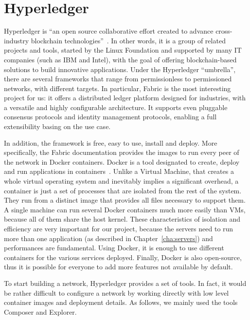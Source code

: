 \section{Hyperledger}
\label{sec:hyperledger}
Hyperledger is ``an open source collaborative effort created to advance cross-industry blockchain technologies''~\cite{hyperledger}. In other words, it is a group of related projects and tools, started by the Linux Foundation and supported by many IT companies (such as IBM and Intel), with the goal of offering blockchain-based solutions to build innovative applications. Under the Hyperledger ``umbrella'', there are several frameworks that range from permissionless to permissioned networks, with different targets. In particular, Fabric is the most interesting project for us: it offers a distributed ledger platform designed for industries, with a versatile and highly configurable architecture. It supports even pluggable consensus protocols and identity management protocols, enabling a full extensibility basing on the use case.

In addition, the framework is free, easy to use, install and deploy. More specifically, the Fabric documentation provides the images to run every peer of the network in Docker containers. Docker is a tool designated to create, deploy and run applications in containers~\cite{docker}. Unlike a Virtual Machine, that creates a whole virtual operating system and inevitably implies a significant overhead, a container is just a set of processes that are isolated from the rest of the system. They run from a distinct image that provides all files necessary to support them. A single machine can run several Docker containers much more easily than VMs, because all of them share the host kernel. These characteristics of isolation and efficiency are very important for our project, because the servers need to run more than one application (as described in Chapter~\ref{cha:servers}) and performances are fundamental. Using Docker, it is enough to use different containers for the various services deployed. Finally, Docker is also open-source, thus it is possible for everyone to add more features not available by default.

To start building a network, Hyperledger provides a set of tools. In fact, it would be rather difficult to configure a network by working directly with low level container images and deployment details. As follows, we mainly used the tools Composer and Explorer.

